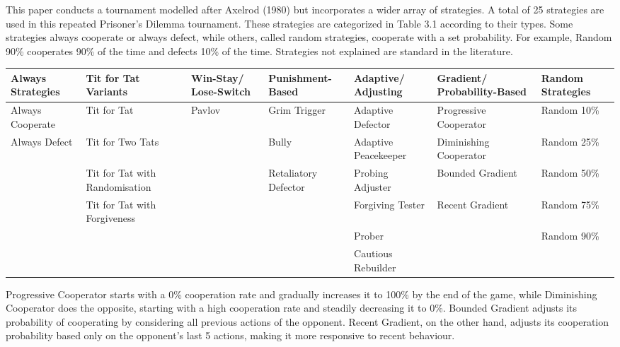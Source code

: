 \documentclass[11pt,preprint]{elsarticle}
\let\origtable\table
\let\endorigtable\endtable
\renewenvironment{table}[1][2] {
    \expandafter\origtable\expandafter[H]
} {
    \endorigtable
}
\numberwithin{equation}{section}
\numberwithin{figure}{section}
\numberwithin{table}{section}
\begin{document}
This paper conducts a tournament modelled after Axelrod (1980) but
incorporates a wider array of strategies. A total of 25 strategies are
used in this repeated Prisoner's Dilemma tournament. These strategies
are categorized in Table 3.1 according to their types. Some strategies
always cooperate or always defect, while others, called random
strategies, cooperate with a set probability. For example, Random 90\%
cooperates 90\% of the time and defects 10\% of the time. Strategies not
explained are standard in the literature.

\renewcommand{\arraystretch}{1.2} %
\begin{table}[ht]
\centering
\tiny %
\begin{tabular}{|>{\centering\arraybackslash}p{2cm}|>{\centering\arraybackslash}p{2cm}|>{\centering\arraybackslash}p{2cm}|>{\centering\arraybackslash}p{2cm}|>{\centering\arraybackslash}p{2cm}|>{\centering\arraybackslash}p{2cm}|>{\centering\arraybackslash}p{2cm}|}
\hline
\textbf{Always Strategies} & \textbf{Tit for Tat Variants} & \textbf{Win-Stay/ Lose-Switch} & \textbf{Punishment-Based} & \textbf{Adaptive/ Adjusting} & \textbf{Gradient/ Probability-Based} & \textbf{Random Strategies} \\
\hline
Always Cooperate & Tit for Tat & Pavlov\footnotemark & Grim Trigger & Adaptive Defector & Progressive Cooperator & Random 10\% \\
Always Defect & Tit for Two Tats & & Bully & Adaptive Peacekeeper & Diminishing Cooperator & Random 25\% \\
& Tit for Tat with Randomisation & & Retaliatory Defector & Probing Adjuster & Bounded Gradient & Random 50\% \\
& Tit for Tat with Forgiveness & & & Forgiving Tester & Recent Gradient & Random 75\% \\
& & & & Prober & & Random 90\% \\
& & & & Cautious Rebuilder & & \\
\hline
\end{tabular}
\caption{Categorisation of Strategy Types Used in the Prisoner's Dilemma Tournament}
\end{table}


Progressive Cooperator starts with a 0\% cooperation rate and gradually
increases it to 100\% by the end of the game, while Diminishing
Cooperator does the opposite, starting with a high cooperation rate and
steadily decreasing it to 0\%. Bounded Gradient adjusts its probability
of cooperating by considering all previous actions of the opponent.
Recent Gradient, on the other hand, adjusts its cooperation probability
based only on the opponent's last 5 actions, making it more responsive
to recent behaviour.
\end{document}
